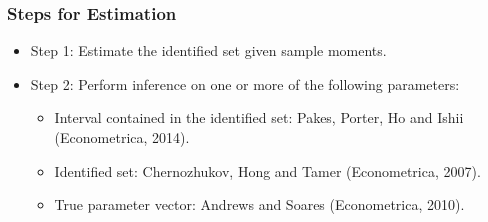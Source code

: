 \documentclass[10pt,letterpaper]{beamer}
\begin{document}

\begin{frame}
\frametitle{Steps for Estimation}

\begin{itemize}
\item Step 1: Estimate the identified set given sample moments. 

\item Step 2: Perform inference on one or more of the following parameters: 

\begin{itemize}
\item Interval contained in the identified set: Pakes, Porter, Ho and Ishii
(Econometrica, 2014). 

\item Identified set: Chernozhukov, Hong and Tamer (Econometrica, 2007). 

\item True parameter vector: Andrews and Soares (Econometrica, 2010). 
\end{itemize}
\end{itemize}
\end{frame}

\end{document}
